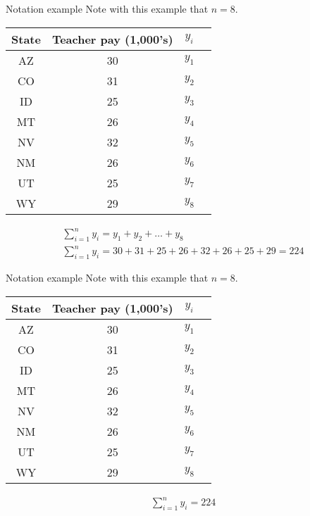 \documentclass[xcolor=dvipsnames]{beamer}
\begin{document}
\begin{frame}{Notation example}
	Note with this example that $n = 8$.
		\begin{center}
		\begin{tabular}{|c|c|c|c|}
			\hline 
			\textbf{State} & \textbf{Teacher pay (1,000's)} & $y_i$ \\ 
			\hline \hline
			AZ & 30 & $y_1$\\ \hline 
			CO &  31 & $y_2$ \\ \hline 
			ID & 25 & $y_3$ \\  \hline 
			MT &  26 & $y_4$ \\ \hline 
			NV & 32 & $y_5$ \\ \hline 
			NM &  26 & $y_6$\\ \hline 
			UT &  25 & $y_7$\\ \hline 
			WY &  29 & $y_8$\\ \hline 
		\end{tabular} 
	\end{center}
\vspace{-7 pt}
\begin{gather*}
	\sum_{i=1}^{n} y_i = y_1 + y_2 + \hdots + y_8 \\
		\sum_{i=1}^{n} y_i = 30+31+25+26+32+26+25+29 = 224
\end{gather*}
\end{frame}

\begin{frame}{Notation example}
	Note with this example that $n = 8$.
	\begin{center}
		\begin{tabular}{|c|c|c|c|}
			\hline 
			\textbf{State} & \textbf{Teacher pay (1,000's)} & $y_i$ \\ 
			\hline \hline
			AZ & 30 & $y_1$\\ \hline 
			CO &  31 & $y_2$ \\ \hline 
			ID & 25 & $y_3$ \\  \hline 
			MT &  26 & $y_4$ \\ \hline 
			NV & 32 & $y_5$ \\ \hline 
			NM &  26 & $y_6$\\ \hline 
			UT &  25 & $y_7$\\ \hline 
			WY &  29 & $y_8$\\ \hline 
		\end{tabular} 
	\end{center}
	\begin{gather*}
	\sum_{i=1}^{n} y_i = 224
	\end{gather*}
\end{frame}
\end{document}
